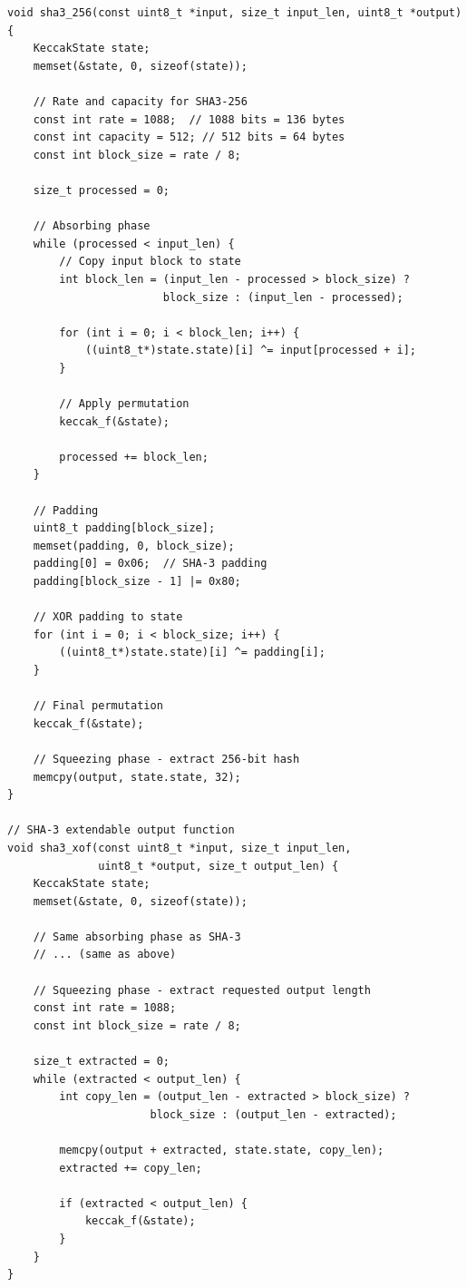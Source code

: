 \begin{lstlisting}[style=cstyle, caption={SHA-3-256 Implementation}]
void sha3_256(const uint8_t *input, size_t input_len, uint8_t *output) {
    KeccakState state;
    memset(&state, 0, sizeof(state));
    
    // Rate and capacity for SHA3-256
    const int rate = 1088;  // 1088 bits = 136 bytes
    const int capacity = 512; // 512 bits = 64 bytes
    const int block_size = rate / 8;
    
    size_t processed = 0;
    
    // Absorbing phase
    while (processed < input_len) {
        // Copy input block to state
        int block_len = (input_len - processed > block_size) ? 
                        block_size : (input_len - processed);
        
        for (int i = 0; i < block_len; i++) {
            ((uint8_t*)state.state)[i] ^= input[processed + i];
        }
        
        // Apply permutation
        keccak_f(&state);
        
        processed += block_len;
    }
    
    // Padding
    uint8_t padding[block_size];
    memset(padding, 0, block_size);
    padding[0] = 0x06;  // SHA-3 padding
    padding[block_size - 1] |= 0x80;
    
    // XOR padding to state
    for (int i = 0; i < block_size; i++) {
        ((uint8_t*)state.state)[i] ^= padding[i];
    }
    
    // Final permutation
    keccak_f(&state);
    
    // Squeezing phase - extract 256-bit hash
    memcpy(output, state.state, 32);
}

// SHA-3 extendable output function
void sha3_xof(const uint8_t *input, size_t input_len, 
              uint8_t *output, size_t output_len) {
    KeccakState state;
    memset(&state, 0, sizeof(state));
    
    // Same absorbing phase as SHA-3
    // ... (same as above)
    
    // Squeezing phase - extract requested output length
    const int rate = 1088;
    const int block_size = rate / 8;
    
    size_t extracted = 0;
    while (extracted < output_len) {
        int copy_len = (output_len - extracted > block_size) ? 
                      block_size : (output_len - extracted);
        
        memcpy(output + extracted, state.state, copy_len);
        extracted += copy_len;
        
        if (extracted < output_len) {
            keccak_f(&state);
        }
    }
}
\end{lstlisting}

